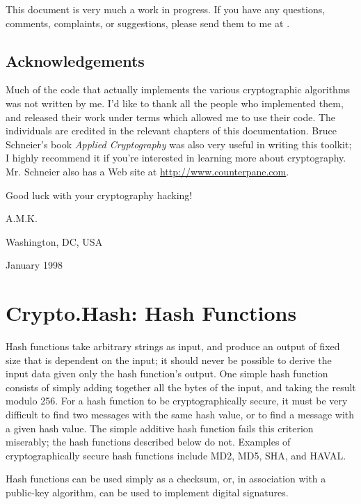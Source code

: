 \documentclass{howto}
\begin{document}
This document is very much a work in progress.  If you have any
questions, comments, complaints, or suggestions, please send them to me
at .

\subsection{Acknowledgements}
Much of the code that actually implements the various cryptographic
algorithms was not written by me.  I'd like to thank all the people who
implemented them, and released their work under terms which allowed me
to use their code.  The individuals are credited in the relevant
chapters of this documentation.  Bruce Schneier's book \emph{Applied
Cryptography} was also very useful in writing this toolkit; I highly
recommend it if you're interested in learning more about cryptography.
Mr. Schneier also has a Web site at \url{http://www.counterpane.com}.

Good luck with your cryptography hacking!

A.M.K.


Washington, DC, USA

January 1998

\section{Crypto.Hash: Hash Functions}

Hash functions take arbitrary strings as input, and produce an output
of fixed size that is dependent on the input; it should never be
possible to derive the input data given only the hash function's
output.  One simple hash function consists of simply adding together
all the bytes of the input, and taking the result modulo 256.  For a
hash function to be cryptographically secure, it must be very
difficult to find two messages with the same hash value, or to find a
message with a given hash value.  The simple additive hash function
fails this criterion miserably; the hash functions described below do
not.  Examples of cryptographically secure hash functions include MD2,
MD5, SHA, and HAVAL.

Hash functions can be used simply as a checksum, or, in association with a
public-key algorithm, can be used to implement digital signatures.
 
\end{document}
